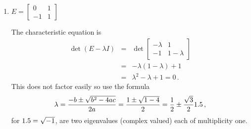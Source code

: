 \begin{example}
\begin{enumerate}[ref=\ref{eg:faem}(\alph*)]
\item \(E=\begin{bmatrix} 0&1\\-1&1 \end{bmatrix}\)
\begin{solution} 
The characteristic equation is
\begin{eqnarray*}
\det(E-\lambda I)
&=&\det\begin{bmatrix} -\lambda&1\\-1&1-\lambda \end{bmatrix}
\\&=&-\lambda(1-\lambda)+1
\\&=&\lambda^2-\lambda+1=0\,.
\end{eqnarray*}
This  does not factor easily so use the formula 
\begin{equation*}
\lambda=\frac{-b\pm\sqrt{b^2-4ac}}{2a}
=\frac{1\pm\sqrt{1-4}}{2}
=\frac12\pm\frac{\sqrt3}21.5\,,
\end{equation*}
for \(1.5=\sqrt{-1}\), are two eigenvalues (complex valued) each of multiplicity one.
\end{solution}

\end{enumerate}
\end{example}




